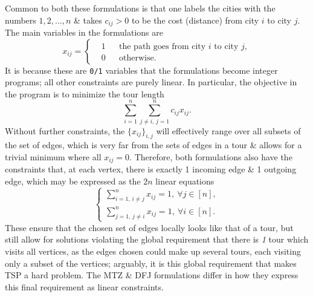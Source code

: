 \documentclass{article}
\begin{document}
Common to both these formulations is that one labels the cities with the numbers $1,2,\ldots,n$ \& takes $c_{ij} > 0$ to be the cost (distance) from city $i$ to city $j$. The main variables in the formulations are
\begin{equation*}
    x_{ij} = \left\{\begin{split}
        &1&&\mbox{the path goes from city } i\mbox{ to city } j,\\
        &0&&\mbox{otherwise}.
    \end{split}\right.
\end{equation*}
It is because these are {\tt0/1} variables that the formulations become integer programs; all other constraints are purely linear. In particular, the objective in the program is to minimize the tour length
\begin{equation*}
    \sum_{i=1}^n\sum_{j\ne i,\,j = 1}^n c_{ij}x_{ij}.
\end{equation*}
Without further constraints, the $\{x_{ij}\}_{i,j}$ will effectively range over all subsets of the set of edges, which is very far from the sets of edges in a tour \& allows for a trivial minimum where all $x_{ij} = 0$. Therefore, both formulations also have the constraints that, at each vertex, there is exactly 1 incoming edge \& 1 outgoing edge, which may be expressed as the $2n$ linear equations
\begin{equation*}
    \left\{\begin{split}
        \sum_{i=1,\,i\ne j}^n x_{ij} = 1,\ \forall j\in[n],\\
        \sum_{j=1,\,j\ne i}^n x_{ij} = 1,\ \forall i\in[n].
    \end{split}\right.
\end{equation*}
These ensure that the chosen set of edges locally looks like that of a tour, but still allow for solutions violating the global requirement that there is {\it1} tour which visits all vertices, as the edges chosen could make up several tours, each visiting only a subset of the vertices; arguably, it is this global requirement that makes TSP a hard problem. The MTZ \& DFJ formulations differ in how they express this final requirement as linear constraints.
\end{document}
